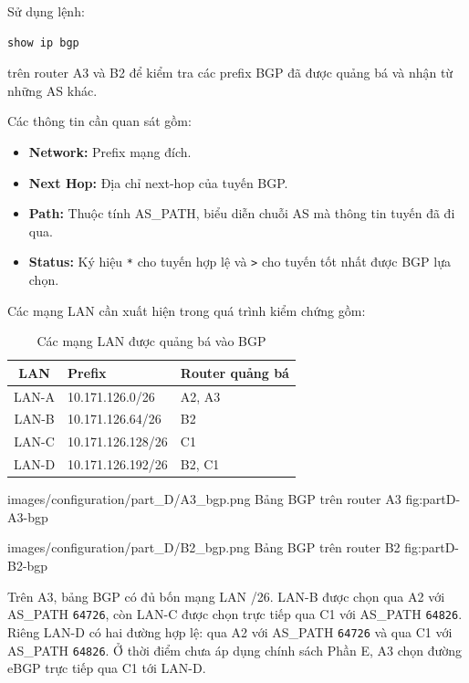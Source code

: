 Sử dụng lệnh:

\begin{lstlisting}
show ip bgp
\end{lstlisting}

trên router A3 và B2 để kiểm tra
các prefix BGP đã được quảng bá
và nhận từ những AS khác.

Các thông tin cần quan sát gồm:

\begin{itemize}

    \item \textbf{Network:}
    Prefix mạng đích.

    \item \textbf{Next Hop:}
    Địa chỉ next-hop của tuyến BGP.

    \item \textbf{Path:}
    Thuộc tính AS\_PATH, biểu diễn
    chuỗi AS mà thông tin tuyến
    đã đi qua.

    \item \textbf{Status:}
    Ký hiệu \texttt{*} cho tuyến hợp lệ
    và \texttt{>} cho tuyến tốt nhất
    được BGP lựa chọn.

\end{itemize}

Các mạng LAN cần xuất hiện
trong quá trình kiểm chứng gồm:

\begin{table}[H]
\centering
\caption{Các mạng LAN được quảng bá vào BGP}
\label{tab:partD-networks}
\small
\begin{tabularx}{\textwidth}{c X X}
\toprule
\textbf{LAN} &
\textbf{Prefix} &
\textbf{Router quảng bá} \\
\midrule
LAN-A & 10.171.126.0/26 & A2, A3 \\
LAN-B & 10.171.126.64/26 & B2 \\
LAN-C & 10.171.126.128/26 & C1 \\
LAN-D & 10.171.126.192/26 & B2, C1 \\
\bottomrule
\end{tabularx}
\end{table}

\partzeroimage
{images/configuration/part_D/A3_bgp.png}
{Bảng BGP trên router A3}
{fig:partD-A3-bgp}

\partzeroimage
{images/configuration/part_D/B2_bgp.png}
{Bảng BGP trên router B2}
{fig:partD-B2-bgp}

Trên A3, bảng BGP có đủ bốn mạng LAN /26.
LAN-B được chọn qua A2 với AS\_PATH \texttt{64726},
còn LAN-C được chọn trực tiếp qua C1
với AS\_PATH \texttt{64826}.
Riêng LAN-D có hai đường hợp lệ:
qua A2 với AS\_PATH \texttt{64726}
và qua C1 với AS\_PATH \texttt{64826}.
Ở thời điểm chưa áp dụng chính sách Phần E,
A3 chọn đường eBGP trực tiếp qua C1 tới LAN-D.

